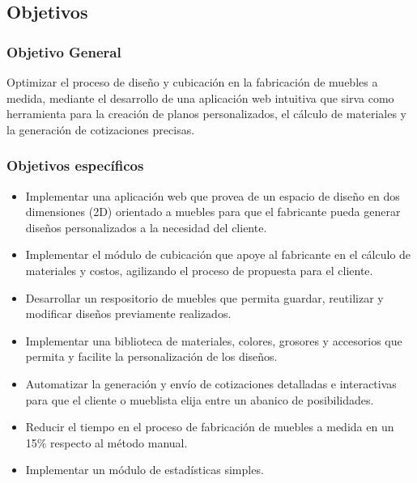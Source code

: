 \documentclass[12pt,oneside]{article}
\begin{document}
\subsection{Objetivos}
\begingroup
\subsubsection{Objetivo General}

Optimizar el proceso de diseño y cubicación en la fabricación de muebles a medida, mediante el desarrollo de una aplicación web intuitiva que sirva como herramienta para la creación de planos personalizados, el cálculo de materiales y la generación de cotizaciones precisas.\\

\subsubsection{Objetivos específicos}
\begin{itemize}
\item Implementar una aplicación web que provea de un espacio de diseño en dos dimensiones (2D) orientado a muebles para que el fabricante pueda generar diseños personalizados a la necesidad del cliente.

\item Implementar el módulo de cubicación que apoye al fabricante en el cálculo de materiales y costos, agilizando el proceso de propuesta para el cliente. 

\item Desarrollar un respositorio de muebles que permita guardar, reutilizar y modificar diseños previamente realizados.

\item Implementar una biblioteca de materiales, colores, grosores y accesorios que permita y facilite la personalización de los diseños.

\item Automatizar la generación y envío de cotizaciones detalladas e interactivas para que el cliente o mueblista elija entre un abanico de posibilidades.

\item Reducir el tiempo en el proceso de fabricación de muebles a medida en un 15\% respecto al método manual.  

\item Implementar un módulo de estadísticas simples.
\end{itemize}
\endgroup
\end{document}
